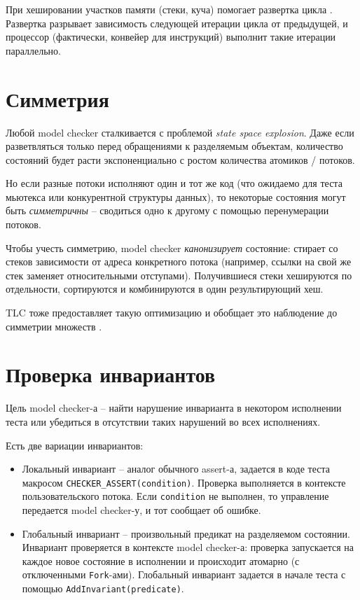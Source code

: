 При хешировании участков памяти (стеки, куча) помогает развертка цикла \autocite{FasterHash}. Развертка разрывает зависимость следующей итерации цикла от предыдущей, и процессор (фактически, конвейер для инструкций) выполнит такие итерации параллельно.

\section{Симметрия}

Любой model checker сталкивается с проблемой \emph{state space explosion}. Даже если разветвляться только перед обращениями к разделяемым объектам, количество состояний будет расти экспоненциально с ростом количества атомиков / потоков. 

Но если разные потоки исполняют один и тот же код (что ожидаемо для теста мьютекса или конкурентной структуры данных), то некоторые состояния могут быть \emph{симметричны} – сводиться одно к другому с помощью перенумерации потоков. 

Чтобы учесть симметрию, model checker \emph{канонизирует} состояние: стирает со стеков зависимости от адреса конкретного потока (например, ссылки на свой же стек заменяет относительными отступами). Получившиеся стеки хешируются по отдельности, сортируются и комбинируются в один результирующий хеш.

TLC тоже предоставляет такую оптимизацию и обобщает это наблюдение до симметрии множеств \autocite{Symmetry}.

\section{Проверка инвариантов}

Цель model checker-а – найти нарушение инварианта в некотором исполнении теста или убедиться в отсутствии таких нарушений во всех исполнениях.

Есть две вариации инвариантов:

\begin{itemize}

\item	Локальный инвариант – аналог обычного assert-а, задается в коде теста макросом \texttt{CHECKER_ASSERT(condition)}. Проверка выполняется в контексте пользовательского потока. Если \texttt{condition} не выполнен, то управление передается model checker-у, и тот сообщает об ошибке. 

\item	Глобальный инвариант – произвольный предикат на разделяемом состоянии. Инвариант проверяется в контексте model checker-а: проверка запускается на каждое новое состояние в исполнении и происходит атомарно (с отключенными \texttt{Fork}-ами). Глобальный инвариант задается в начале теста с помощью \texttt{AddInvariant(predicate)}.

\end{itemize}

